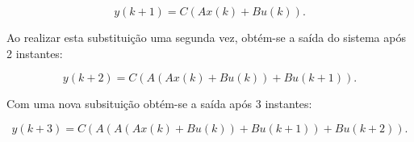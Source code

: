 \begin{equation}
	\label{eq:first-output}
	y(k+1) = C ( A x(k) + B u(k) ).
\end{equation}

Ao realizar esta substituição uma segunda vez, obtém-se a saída do sistema após
2 instantes:

\begin{equation}
	\label{eq:second-output}
	y(k+2) = C ( A ( A x(k) + B u(k) ) + B u(k+1) ).
\end{equation}

Com uma nova subsituição obtém-se a saída após 3 instantes:

\begin{equation}
	\label{eq:third-output}
	y(k+3) = C ( A ( A ( A x(k) + B u(k) ) + B u(k+1) ) + B u(k+2) ).
\end{equation}

